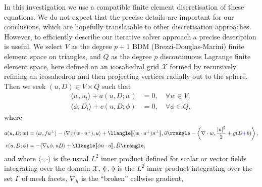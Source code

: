 \documentclass[a4paper, 12pt]{article}
\newcommand{\todo}[1]{\vspace{5 mm}\par \noindent
	\framebox{\begin{minipage}[c]{0.95 \textwidth}
			\tt #1 \end{minipage}}\vspace{5 mm}\par}
\newcommand{\werner}[1]{{\color{cyan}WB says: #1}}
\newcommand{\revisedA}[1]{#1}
\newcommand{\revisedC}[1]{{\color{blue}#1}}
\newcommand{\jump}[1]{[\![#1]\!]}
\begin{document}
In this investigation we use a compatible finite element
discretisation of these equations. We do not expect that the precise
details are important for our conclusions, which are hopefully
  translatable to other discretisation approaches. However, to
efficiently describe our iterative solver approach a precise
description is useful. We select $V$ as the degree $p+1$ BDM
\revisedA{(Brezzi-Douglas-Marini)} finite element space on triangles,
and $Q$ as the degree $p$ discontinuous Lagrange finite element space,
here defined on an icosahedral grid $\mathcal{X}$ formed by
recursively refining an icosahedron and then projecting vertices
radially out to the sphere.  Then we seek $(u,D)\in V\times Q$ such
that
\begin{align}
  \label{eq:ut}
  \langle w, u_t \rangle + a(u,D;w) 
   & = 0,
  \quad \forall w \in V, \\
  \label{eq:Dt}
  \langle \phi, D_t \rangle
+ c(u,D; \phi) & =
 0, \quad \forall \phi \in Q,
\end{align}
where
\begin{align}
   a(u,D;w) 
&=
  \langle w, fu^\perp \rangle 
  - \langle \nabla_h^\perp (w\cdot u^\perp), u \rangle
  + \llangle \jump{(w\cdot u^\perp) n^\perp}, \tilde{u} \rrangle  - \left\langle \nabla\cdot w, \frac{|u|^2}{2} + g(D
  \revisedC{+}b) \right\rangle, \\
  c(u,D; \phi) &=
  - \langle \nabla_h \phi, uD \rangle
  + \llangle \jump{\phi n\cdot u}, \tilde{D} \rrangle,
\end{align}
and where $\langle \cdot , \cdot \rangle$ is the usual $L^2$ inner
product defined for scalar or vector fields integrating over the
domain $\mathcal{X}$, $\llangle\cdot,\cdot \rrangle$ is the $L^2$
inner product integrating over the set $\Gamma$ of mesh facets,
$\nabla_h$ is the ``broken'' cellwise gradient,
\end{document}
